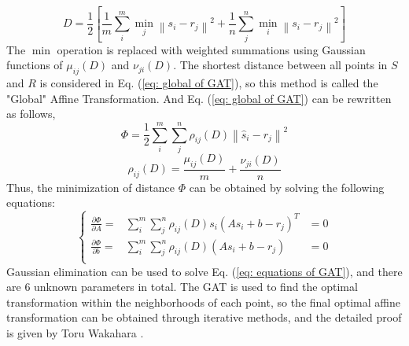 \begin{equation}\label{eq: global of GAT}
    D = \frac{1}{2}\left[ \frac{1}{m}\sum_i^m\underset{j}{\min}\left\| s_i-r_j \right\|^2 + \frac{1}{n}\sum_j^n\underset{i}{\min}\left\| s_i-r_j \right\|^2 \right]
\end{equation}
The $\min$ operation is replaced with weighted summations using Gaussian functions of $\mu_{ij}(D)$ and $\nu_{ji}(D)$. The shortest distance between all points in $S$ and $R$ is considered in Eq. (\ref{eq: global of GAT}), so this method is called the "Global" Affine Transformation. And Eq. (\ref{eq: global of GAT}) can be rewritten as follows,
\begin{equation}
    \Phi = \frac{1}{2} \sum_i^m\sum_j^n \rho_{ij}(D)\left\| \hat{s}_i - r_j \right\|^2
\end{equation}
\begin{equation*}
    \rho_{ij}(D) = \frac{\mu_{ij}(D)}{m} + \frac{\nu_{ji}(D)}{n}
\end{equation*}
Thus, the minimization of distance $\Phi$ can be obtained by solving the following equations:
\begin{equation}\label{eq: equations of GAT}
    \left\{\begin{matrix}
        \frac{\partial \Phi}{\partial A} =& \sum_i^m\sum_j^n\rho_{ij}(D)s_i(As_i+b-r_j)^T &= 0 \\
        \frac{\partial \Phi}{\partial b} =& \sum_i^m\sum_j^n\rho_{ij}(D)(As_i+b-r_j) &= 0 \\
    \end{matrix}\right.
\end{equation}
Gaussian elimination can be used to solve Eq. (\ref{eq: equations of GAT}), and there are $6$ unknown parameters in total. The GAT is used to find the optimal transformation within the neighborhoods of each point, so the final optimal affine transformation can be obtained through iterative methods, and the detailed proof is given by Toru Wakahara \cite{GAT:wakahara1998adaptive}.

